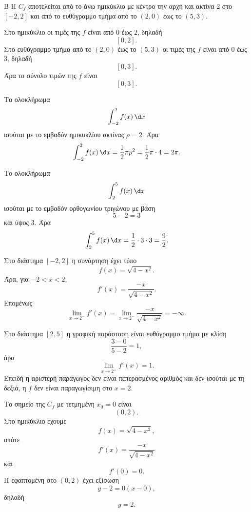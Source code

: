 \begin{thema}{Β}
Η $C_f$ αποτελείται από το άνω ημικύκλιο με κέντρο την αρχή και ακτίνα $2$ στο $[-2,2]$ και από το ευθύγραμμο τμήμα από το $(2,0)$ έως το $(5,3)$.
\begin{erwthma}
\item Στο ημικύκλιο οι τιμές της $f$ είναι από $0$ έως $2$, δηλαδή
\[
[0,2].
\]
Στο ευθύγραμμο τμήμα από το $(2,0)$ έως το $(5,3)$ οι τιμές της $f$ είναι από $0$ έως $3$, δηλαδή
\[
[0,3].
\]
Άρα το σύνολο τιμών της $f$ είναι
\[
{[0,3]}.
\]

\item Το ολοκλήρωμα
\[
\dint_{-2}^{2}f(x)\,\d x
\]
ισούται με το εμβαδόν ημικυκλίου ακτίνας $\rho=2$. Άρα
\[
\dint_{-2}^{2}f(x)\,\d x
=\frac12\pi\rho^2
=\frac12\pi\cdot4
=2\pi.
\]

Το ολοκλήρωμα
\[
\dint_{2}^{5}f(x)\,\d x
\]
ισούται με το εμβαδόν ορθογωνίου τριγώνου με βάση
\[
5-2=3
\]
και ύψος $3$. Άρα
\[
\dint_{2}^{5}f(x)\,\d x
=\frac12\cdot3\cdot3
=\frac92.
\]

\item Στο διάστημα $[-2,2]$ η συνάρτηση έχει τύπο
\[
f(x)=\sqrt{4-x^2}.
\]
Άρα, για $-2<x<2$,
\[
f'(x)=\frac{-x}{\sqrt{4-x^2}}.
\]
Επομένως
\[
\lim_{x\to2^-}f'(x)
=\lim_{x\to2^-}\frac{-x}{\sqrt{4-x^2}}
=-\infty.
\]

Στο διάστημα $[2,5]$ η γραφική παράσταση είναι ευθύγραμμο τμήμα με κλίση
\[
\frac{3-0}{5-2}=1,
\]
άρα
\[
\lim_{x\to2^+}f'(x)=1.
\]
Επειδή η αριστερή παράγωγος δεν είναι πεπερασμένος αριθμός και δεν ισούται με τη δεξιά, η $f$ δεν είναι παραγωγίσιμη στο $x=2$.

\item Το σημείο της $C_f$ με τετμημένη $x_0=0$ είναι
\[
(0,2).
\]
Στο ημικύκλιο έχουμε
\[
f(x)=\sqrt{4-x^2},
\]
οπότε
\[
f'(x)=\frac{-x}{\sqrt{4-x^2}}
\]
και
\[
f'(0)=0.
\]
Η εφαπτομένη στο $(0,2)$ έχει εξίσωση
\[
y-2=0(x-0),
\]
δηλαδή
\[
{y=2}.
\]
\end{erwthma}
\end{thema}

